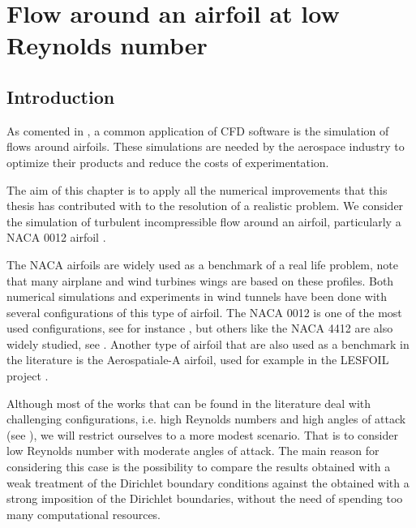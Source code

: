 \chapter{Flow around an airfoil at low Reynolds number}
\label{chap-NACA}

\section{Introduction}
\label{sec-C8_introduction}
As comented in , a common application of CFD software is the simulation of flows around airfoils. These simulations are needed by the aerospace industry to optimize their products and reduce the costs of experimentation.

The aim of this chapter is to apply all the numerical improvements that this thesis has contributed with to the resolution of a realistic problem. We consider the simulation of turbulent incompressible flow around an airfoil, particularly a NACA 0012 airfoil  \cite{jacobs_eastman_n_ward_kenneth_e_pinkerton_robert_m_characteristics_1933}.

The NACA airfoils are widely used as a benchmark of a real life problem, note that many airplane and wind turbines wings are based on these profiles. Both numerical simulations and experiments in wind tunnels have been done with several configurations of this type of airfoil. The NACA 0012 is one of the most used configurations, see for instance \cite{sheldahl_aerodynamic_1981,mccroskey_w._j._critical_????,jose_rivera_naca_????}, but others like the NACA 4412 are also widely studied, see \cite{wadcock_investigation_1987,hastings_studies_1984}. Another type of airfoil that are also used as a benchmark in the literature is the Aerospatiale-A airfoil, used for example in the LESFOIL project \cite{davidson_lesfoil:_2012}.

Although most of the works that can be found in the literature deal with challenging configurations, i.e. high Reynolds numbers and high angles of attack (see \cite{jansen_stabilized_1999, kaltenbach_large-eddy_1995, schmidt_assessment_????,mellen_lessons_2003}), we will restrict ourselves to a more modest scenario. That is to consider low Reynolds number with moderate angles of attack. The main reason for considering this case is the possibility to compare the results obtained with a weak treatment of the Dirichlet boundary conditions against the obtained with a strong imposition of the Dirichlet boundaries, without the need of spending too many computational resources.

